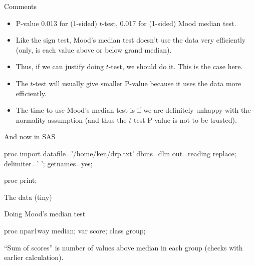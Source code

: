 \documentclass[unknownkeysallowed]{beamer}\usepackage[]{graphicx}\usepackage[]{color}
\begin{document}
\begin{frame}[fragile]{Comments}
  
  \begin{itemize}
    
  \item P-value 0.013 for (1-sided) $t$-test, 0.017 for (1-sided) Mood
    median test.
  \item Like the sign test, Mood's median test doesn't use the data
    very efficiently (only, is each value above or below grand
    median).
  \item Thus, if we can justify doing $t$-test, we should do it. This
    is the case here.
  \item The $t$-test will usually give smaller P-value because it uses
    the data more efficiently.
  \item The time to use Mood's median test is if we are definitely
    unhappy with the normality assumption (and thus the $t$-test
    P-value is not to be trusted).
  \end{itemize}
  
\end{frame}

\begin{frame}[fragile]{And now in SAS}
  \begin{Datastep}
proc import
  datafile='/home/ken/drp.txt'
  dbms=dlm
  out=reading
  replace;
  delimiter=' ';
  getnames=yes;
\end{Datastep}
\begin{Sascode}[store=iw]
  proc print;
\end{Sascode}

\end{frame}

\begin{frame}[fragile]{The data (tiny)}
  
  
\end{frame}

\begin{frame}[fragile]{Doing Mood's median test}
  
  \begin{Sascode}[store=iv]
proc npar1way median;
  var score;
  class group;
  \end{Sascode}
  
  

    ``Sum of scores'' is number of values above median in each group
    (checks with earlier calculation).

\end{frame}
\end{document}
